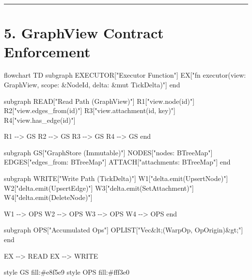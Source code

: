 \documentclass[
]{book}
\newenvironment{Shaded}{}{}
\newcommand{\NormalTok}[1]{#1}
\begin{document}
\begin{center}\rule{0.5\linewidth}{0.5pt}\end{center}

\section{5. GraphView Contract
Enforcement}\label{graphview-contract-enforcement}

\begin{Shaded}
\begin{Highlighting}[]
\NormalTok{flowchart TD}
\NormalTok{    subgraph EXECUTOR["Executor Function"]}
\NormalTok{        EX["fn executor(view: GraphView, scope: \&NodeId, delta: \&mut TickDelta)"]}
\NormalTok{    end}

\NormalTok{    subgraph READ["Read Path (GraphView)"]}
\NormalTok{        R1["view.node(id)"]}
\NormalTok{        R2["view.edges\_from(id)"]}
\NormalTok{        R3["view.attachment(id, key)"]}
\NormalTok{        R4["view.has\_edge(id)"]}

\NormalTok{        R1 {-}{-}\textgreater{} GS}
\NormalTok{        R2 {-}{-}\textgreater{} GS}
\NormalTok{        R3 {-}{-}\textgreater{} GS}
\NormalTok{        R4 {-}{-}\textgreater{} GS}
\NormalTok{    end}

\NormalTok{    subgraph GS["GraphStore (Immutable)"]}
\NormalTok{        NODES["nodes: BTreeMap"]}
\NormalTok{        EDGES["edges\_from: BTreeMap"]}
\NormalTok{        ATTACH["attachments: BTreeMap"]}
\NormalTok{    end}

\NormalTok{    subgraph WRITE["Write Path (TickDelta)"]}
\NormalTok{        W1["delta.emit(UpsertNode)"]}
\NormalTok{        W2["delta.emit(UpsertEdge)"]}
\NormalTok{        W3["delta.emit(SetAttachment)"]}
\NormalTok{        W4["delta.emit(DeleteNode)"]}

\NormalTok{        W1 {-}{-}\textgreater{} OPS}
\NormalTok{        W2 {-}{-}\textgreater{} OPS}
\NormalTok{        W3 {-}{-}\textgreater{} OPS}
\NormalTok{        W4 {-}{-}\textgreater{} OPS}
\NormalTok{    end}

\NormalTok{    subgraph OPS["Accumulated Ops"]}
\NormalTok{        OPLIST["Vec\&lt;(WarpOp, OpOrigin)\&gt;"]}
\NormalTok{    end}

\NormalTok{    EX {-}{-}\textgreater{} READ}
\NormalTok{    EX {-}{-}\textgreater{} WRITE}

\NormalTok{    style GS fill:\#e8f5e9}
\NormalTok{    style OPS fill:\#fff3e0}
\end{Highlighting}
\end{Shaded}
\end{document}
